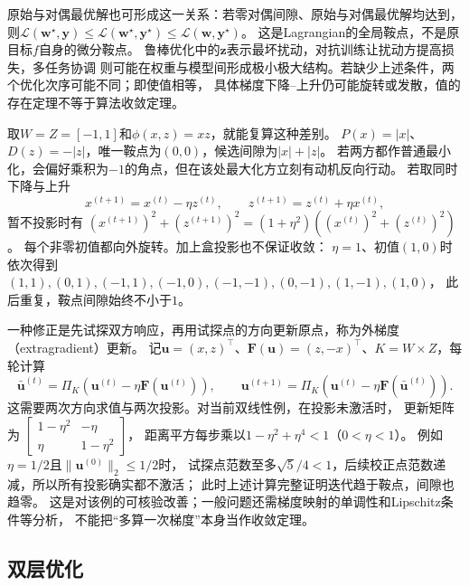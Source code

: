 原始与对偶最优解也可形成这一关系：若零对偶间隙、原始与对偶最优解均达到，
则$\mathcal L(\bm w^\star,\bm y)\leq
\mathcal L(\bm w^\star,\bm y^\star)\leq\mathcal L(\bm w,\bm y^\star)$。
这是Lagrangian的全局鞍点，不是原目标$f$自身的微分鞍点。
鲁棒优化中的$\bm{z}$表示最坏扰动，对抗训练让扰动方提高损失，多任务协调
则可能在权重与模型间形成极小极大结构。若缺少上述条件，两个优化次序可能不同；即使值相等，
具体梯度下降--上升仍可能旋转或发散，值的存在定理不等于算法收敛定理。

取$W=Z=[-1,1]$和$\phi(x,z)=xz$，就能复算这种差别。
$P(x)=|x|$、$D(z)=-|z|$，唯一鞍点为$(0,0)$，候选间隙为$|x|+|z|$。
若两方都作普通最小化，会偏好乘积为$-1$的角点，但在该处最大化方立刻有动机反向行动。
若取同时下降与上升
\[
 x^{(t+1)}=x^{(t)}-\eta z^{(t)},\qquad
 z^{(t+1)}=z^{(t)}+\eta x^{(t)},
\]
暂不投影时有
$(x^{(t+1)})^2+(z^{(t+1)})^2=(1+\eta^2)((x^{(t)})^2+(z^{(t)})^2)$。
每个非零初值都向外旋转。加上盒投影也不保证收敛：
$\eta=1$、初值$(1,0)$时依次得到
$(1,1),(0,1),(-1,1),(-1,0),(-1,-1),(0,-1),(1,-1),(1,0)$，
此后重复，鞍点间隙始终不小于$1$。

一种修正是先试探双方响应，再用试探点的方向更新原点，称为外梯度（extragradient）更新。
记$\bm u=(x,z)^\top$、$\bm F(\bm u)=(z,-x)^\top$、$K=W\times Z$，每轮计算
\[
 \bar{\bm u}^{(t)}=\Pi_K(\bm u^{(t)}-\eta\bm F(\bm u^{(t)})),\qquad
 \bm u^{(t+1)}=\Pi_K(\bm u^{(t)}-\eta\bm F(\bar{\bm u}^{(t)})).
\]
这需要两次方向求值与两次投影。对当前双线性例，在投影未激活时，
更新矩阵为
$\left[\begin{smallmatrix}1-\eta^2&-\eta\\ \eta&1-\eta^2\end{smallmatrix}\right]$，
距离平方每步乘以$1-\eta^2+\eta^4<1$（$0<\eta<1$）。
例如$\eta=1/2$且$\|\bm u^{(0)}\|_2\leq1/2$时，
试探点范数至多$\sqrt{5}/4<1$，后续校正点范数递减，所以所有投影确实都不激活；
此时上述计算完整证明迭代趋于鞍点，间隙也趋零。
这是对该例的可核验改善；一般问题还需梯度映射的单调性和Lipschitz条件等分析，
不能把“多算一次梯度”本身当作收敛定理。

\subsection{双层优化}
\label{sec:opt-bilevel}

